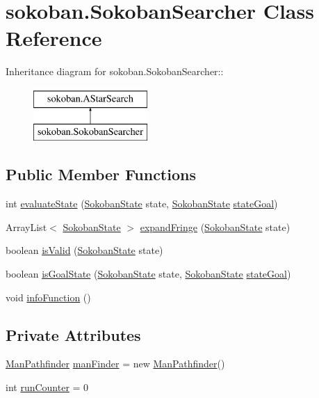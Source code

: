 \hypertarget{classsokoban_1_1SokobanSearcher}{
\section{sokoban.SokobanSearcher Class Reference}
\label{classsokoban_1_1SokobanSearcher}
}
Inheritance diagram for sokoban.SokobanSearcher::\begin{figure}[H]
\begin{center}
\leavevmode
\includegraphics[height=2cm]{classsokoban_1_1SokobanSearcher}
\end{center}
\end{figure}
\subsection*{Public Member Functions}
\begin{CompactItemize}
\item 
int \hyperlink{classsokoban_1_1SokobanSearcher_897cc65b82be53f807b06a71a822a107}{evaluateState} (\hyperlink{classsokoban_1_1SokobanState}{SokobanState} state, \hyperlink{classsokoban_1_1SokobanState}{SokobanState} \hyperlink{classsokoban_1_1AStarSearch_b79570b0700c83ab7f3ef553923b5c00}{stateGoal})
\item 
ArrayList$<$ \hyperlink{classsokoban_1_1SokobanState}{SokobanState} $>$ \hyperlink{classsokoban_1_1SokobanSearcher_fed3f74dd438abffdebe84a6a4d96e62}{expandFringe} (\hyperlink{classsokoban_1_1SokobanState}{SokobanState} state)
\item 
boolean \hyperlink{classsokoban_1_1SokobanSearcher_e5825be60850700a399b70cab9549ab3}{isValid} (\hyperlink{classsokoban_1_1SokobanState}{SokobanState} state)
\item 
boolean \hyperlink{classsokoban_1_1SokobanSearcher_e71f7570b3b8f44fae9c5999ef1cb585}{isGoalState} (\hyperlink{classsokoban_1_1SokobanState}{SokobanState} state, \hyperlink{classsokoban_1_1SokobanState}{SokobanState} \hyperlink{classsokoban_1_1AStarSearch_b79570b0700c83ab7f3ef553923b5c00}{stateGoal})
\item 
void \hyperlink{classsokoban_1_1SokobanSearcher_d180c4da1ca3b7099d1e820843c619d0}{infoFunction} ()
\end{CompactItemize}
\subsection*{Private Attributes}
\begin{CompactItemize}
\item 
\hyperlink{classsokoban_1_1ManPathfinder}{ManPathfinder} \hyperlink{classsokoban_1_1SokobanSearcher_9c7a40209ca21c1a14ca780c90859571}{manFinder} = new \hyperlink{classsokoban_1_1ManPathfinder}{ManPathfinder}()
\item 
int \hyperlink{classsokoban_1_1SokobanSearcher_cafbb5effcf6f77396cacec598a3a16e}{runCounter} = 0
\end{CompactItemize}


